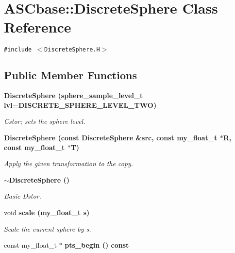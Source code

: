 \section{ASCbase::Discrete\-Sphere Class Reference}
\label{classASCbase_1_1DiscreteSphere}
{\tt \#include $<$Discrete\-Sphere.H$>$}

\subsection*{Public Member Functions}
\begin{CompactItemize}
\item 
\bf{Discrete\-Sphere} (sphere\_\-sample\_\-level\_\-t lvl=DISCRETE\_\-SPHERE\_\-LEVEL\_\-TWO)\label{classASCbase_1_1DiscreteSphere_e621966eb3054dab3f2f9798bca76a6b}

\begin{CompactList}\small\item\em Cstor; sets the sphere level. \item\end{CompactList}\item 
\bf{Discrete\-Sphere} (const \bf{Discrete\-Sphere} \&src, const my\_\-float\_\-t $\ast$R, const my\_\-float\_\-t $\ast$T)\label{classASCbase_1_1DiscreteSphere_d712606834a92c7735f3522a9c1983dc}

\begin{CompactList}\small\item\em Apply the given transformation to the copy. \item\end{CompactList}\item 
\bf{$\sim$Discrete\-Sphere} ()\label{classASCbase_1_1DiscreteSphere_0e4e024bf87c9f629c58e96e405a48e9}

\begin{CompactList}\small\item\em Basic Dstor. \item\end{CompactList}\item 
void \bf{scale} (my\_\-float\_\-t s)\label{classASCbase_1_1DiscreteSphere_499dd540bc049f849618e63141a762c9}

\begin{CompactList}\small\item\em Scale the current sphere by s. \item\end{CompactList}\item 
const my\_\-float\_\-t $\ast$ \bf{pts\_\-begin} () const \label{classASCbase_1_1DiscreteSphere_cc1900a41dc02c937dee4964eb40f805}


\end{CompactItemize}
